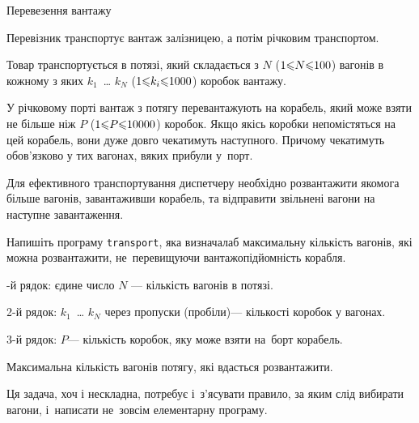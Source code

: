 \documentclass[14pt,a4paper]{extarticle}
\begin{document}
\begin{problemAllDefault}{Перевезення вантажу}

Перевізник транспортує вантаж залізницею, а потім річковим транспортом.

Товар транспортується в потязі, який складається з $N$ ($1{\leqslant}N{\leqslant}100$) вагонів в кожному з яких $k_1$~\dots{} $k_N$ ($1{\leqslant}k_i{\leqslant}1000$) коробок вантажу.

У річковому порті вантаж з потягу перевантажують на корабель, який може взяти не більше ніж $P$ ($1{\leqslant}P{\leqslant}10000$) коробок. Якщо якісь коробки не\nolinebreak[3] помістяться на цей корабель, вони дуже довго чекатимуть наступного. Причому чекатимуть обов'язково у тих вагонах, в\nolinebreak[3] яких прибули у~порт.

Для ефективного транспортування диспетчеру необхідно розвантажити якомога більше вагонів, завантаживши корабель, та відправити звільнені вагони на наступне завантаження.

\Task	Напишіть програму \texttt{transport}, яка визначала\nolinebreak[3] б максимальну кількість вагонів, які можна розвантажити, не~перевищуючи вантажопідйомність корабля.

-й рядок: єдине число $N$ --- кількість вагонів в потязі.

2-й рядок: $k_1$~\dots{} $k_N$ через пропуски (пробіли)\nolinebreak[3] --- кількості коробок у вагонах.

3-й рядок: $P$\nolinebreak[3] --- кількість коробок, яку може взяти на~борт корабель.


\OutputFile Максимальна кількість вагонів потягу, які вдасться розвантажити.


\Example
\begin{exampleSimple}{5em}{3em}%
%
\end{exampleSimple}

\end{problemAllDefault}
	

\Tutorial	Ця задача, хоч і нескладна, потребує і~з'ясувати правило, за яким слід вибирати вагони, і~написати не~зовсім елементарну програму. 

{



}
\end{document}
